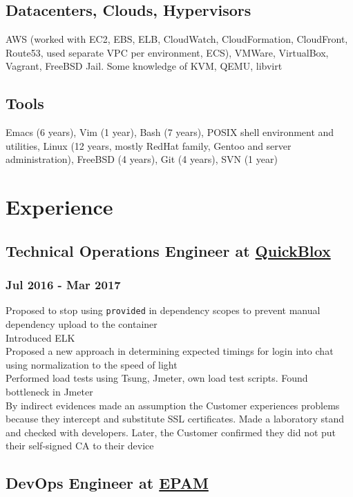 \documentclass[letterpaper]{article}
\begin{document}
\subsection{Datacenters, Clouds, Hypervisors}
\label{sec-1-7}
AWS (worked with EC2, EBS, ELB, CloudWatch, CloudFormation, CloudFront, Route53, used separate VPC per environment, ECS),
VMWare,
VirtualBox,
Vagrant,
FreeBSD Jail.
Some knowledge of KVM, QEMU, libvirt
\subsection{Tools}
\label{sec-1-8}
Emacs (6 years),
Vim (1 year),
Bash (7 years),
POSIX shell environment and utilities,
Linux (12 years, mostly RedHat family, Gentoo and server administration),
FreeBSD (4 years),
Git (4 years),
SVN (1 year)
\section{Experience}
\label{sec-2}
\subsection{Technical Operations Engineer at \href{https://quickblox.com}{QuickBlox}}
\label{sec-2-1}
\subsubsection{Jul 2016 - Mar 2017}
\label{sec-2-1-1}
Proposed to stop using \verb~provided~ in dependency scopes to prevent manual dependency upload to the container\\
Introduced ELK\\
Proposed a new approach in determining expected timings for login into chat using normalization to the speed of light\\
Performed load tests using Tsung, Jmeter, own load test scripts. Found bottleneck in Jmeter\\
By indirect evidences made an assumption the Customer experiences problems because they intercept and substitute SSL certificates. Made a laboratory stand and checked with developers. Later, the Customer confirmed they did not put their self-signed CA to their device\\
\subsection{DevOps Engineer at \href{https://epam.com}{EPAM}}
\label{sec-2-2}
\end{document}

